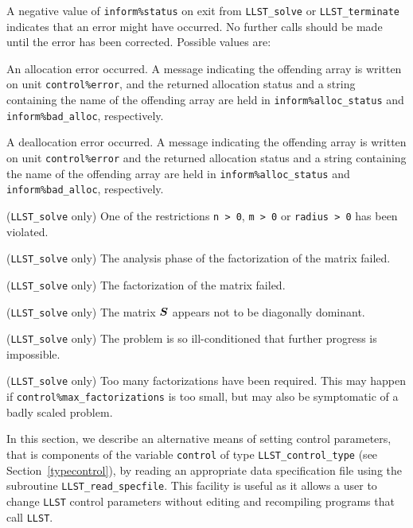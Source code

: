 \documentclass{galahad}
\newcommand{\packagename}{LLST}
\begin{document}

\galerrors
A negative value of  {\tt inform\%status} on exit from
{\tt \packagename\_solve}
or
{\tt \packagename\_terminate}
indicates that an error might have occurred. No further calls should be made
until the error has been corrected. Possible values are:

\begin{description}
 An allocation error occurred. A message indicating
the offending
array is written on unit {\tt control\%error}, and the returned allocation
status and a string containing the name of the offending array
are held in {\tt inform\%alloc\_\-status}
and {\tt inform\%bad\_alloc}, respectively.

 A deallocation error occurred.
A message indicating the offending
array is written on unit {\tt control\%error} and the returned allocation
status and a string containing the name of the offending array
are held in {\tt inform\%alloc\_\-status}
and {\tt inform\%bad\_alloc}, respectively.

 ({\tt \packagename\_solve} only)
One of the restrictions
{\tt n > 0},
{\tt m > 0}
or
{\tt radius > 0}
has been violated.

 ({\tt \packagename\_solve} only)
The analysis phase of the factorization of the matrix  failed.

 ({\tt \packagename\_solve} only)
The factorization of the matrix  failed.

 ({\tt \packagename\_solve} only)
The matrix ${\bm{S}}$ appears not to be diagonally dominant.

 ({\tt \packagename\_solve} only)
The problem is so ill-conditioned that further progress is impossible.

 ({\tt \packagename\_solve} only)
 Too many factorizations have been required.  This may happen if
    {\tt control\%max\_factorizations} is too small,
    but may also be symptomatic of a badly scaled problem.

\end{description}


\galfeatures
\noindent In this section, we describe an alternative means of setting
control parameters, that is components of the variable {\tt control} of type
{\tt \packagename\_control\_type}
(see Section~\ref{typecontrol}),
by reading an appropriate data specification file using the
subroutine {\tt \packagename\_read\_specfile}. This facility
is useful as it allows a user to change  {\tt \packagename} control parameters
without editing and recompiling programs that call {\tt \packagename}.
\end{document}

